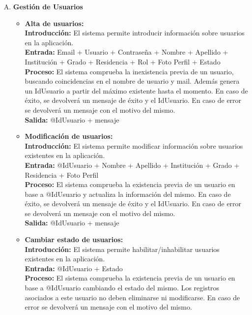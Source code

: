     \begin{enumerate}[A.]
      \item \textbf{Gestión de Usuarios}
        \begin{itemize}  
          \item \textbf{Alta de usuarios:}
            \\ \textbf{Introducción:} El sistema permite introducir información sobre usuarios en la aplicación.
            \\ \textbf{Entrada:} Email + Usuario + Contraseña + Nombre + Apellido + Institución + Grado + Residencia + Rol + Foto Perfil + Estado 
            \\ \textbf{Proceso:} El sistema comprueba la inexistencia previa de un usuario, buscando coincidencias en el nombre de usuario y mail. Además genera un IdUsuario a partir del máximo existente hasta el momento. En caso de éxito, se devolverá un mensaje de éxito y el IdUsuario. En caso de error se devolverá un mensaje con el motivo del mismo.
            \\ \textbf{Salida:} @IdUsuario + mensaje
            \\
          \item \textbf{Modificación de usuarios:}
            \\ \textbf{Introducción:} El sistema permite modificar información sobre usuarios existentes en la aplicación.
            \\ \textbf{Entrada:} @IdUsuario + Nombre + Apellido + Institución + Grado + Residencia + Foto Perfil
            \\ \textbf{Proceso:} El sistema comprueba la existencia previa de un usuario en base a @IdUsuario y actualiza la información del mismo. En caso de éxito, se devolverá un mensaje de éxito y el IdUsuario. En caso de error se devolverá un mensaje con el motivo del mismo.
            \\ \textbf{Salida:} @IdUsuario + mensaje
            \\
          \item \textbf{Cambiar estado de usuarios:}
            \\ \textbf{Introducción:} El sistema permite habilitar/inhabilitar  usuarios existentes en la aplicación.
            \\ \textbf{Entrada:} @IdUsuario + Estado
            \\ \textbf{Proceso:} El sistema comprueba la existencia previa de un usuario en base a @IdUsuario cambiando el estado del mismo. Los registros asociados a este usuario no deben eliminarse ni modificarse. En caso de error se devolverá un mensaje con el motivo del mismo.

\end{itemize}
\end{enumerate}
